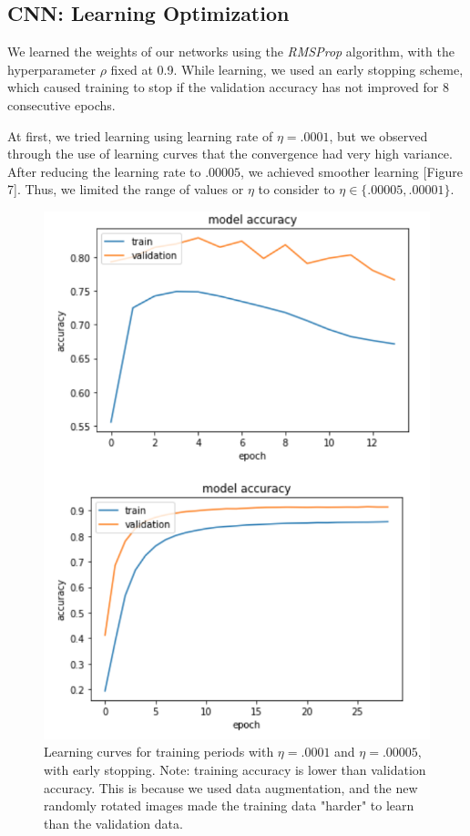 \documentclass[letterpaper, 10 pt, conference]{ieeeconf}  %
\begin{document}
\subsection{CNN: Learning Optimization} 

We learned the weights of our networks using the \emph{RMSProp} algorithm, with the hyperparameter $\rho$ fixed at 0.9. While learning, we used an early stopping scheme, which caused training to stop if the validation accuracy has not improved for 8 consecutive epochs. 

At first, we tried learning using learning rate of $\eta = .0001$, but we observed through the use of learning curves that the convergence had very high variance. After reducing the learning rate to $.00005$, we achieved smoother learning [Figure 7]. Thus, we limited the range of values or $\eta$ to consider to $\eta \in \{.00005, .00001\}$.

\begin{figure}
      \centering
      \includegraphics[scale = .6]{learning_curves.png}
		\centering
      \caption{Learning curves for training periods with $\eta = .0001$ and $\eta = .00005$, with early stopping. Note: training accuracy is lower than validation accuracy. This is because we used data augmentation, and the new randomly rotated images made the training data "harder" to learn than the validation data.}
      \label{figurelabel}
\end{figure}
\end{document}
